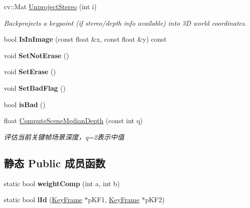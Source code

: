 \begin{DoxyCompactItemize}
\item 
cv\-::\-Mat \hyperlink{classORB__SLAM2_1_1KeyFrame_a0d2dc03ca0d62fc5585773e43d503e79}{Unproject\-Stereo} (int i)
\begin{DoxyCompactList}\small\item\em Backprojects a keypoint (if stereo/depth info available) into 3\-D world coordinates. \end{DoxyCompactList}\item 
\hypertarget{classORB__SLAM2_1_1KeyFrame_a680f4de60b656aabb8e9622a0e7d6d58}{bool {\bfseries Is\-In\-Image} (const float \&x, const float \&y) const }\label{classORB__SLAM2_1_1KeyFrame_a680f4de60b656aabb8e9622a0e7d6d58}

\item 
\hypertarget{classORB__SLAM2_1_1KeyFrame_aa64c7adb5f80f260cb7e997f68881b09}{void {\bfseries Set\-Not\-Erase} ()}\label{classORB__SLAM2_1_1KeyFrame_aa64c7adb5f80f260cb7e997f68881b09}

\item 
\hypertarget{classORB__SLAM2_1_1KeyFrame_a9424cf54c979bc87df12b48e3827e834}{void {\bfseries Set\-Erase} ()}\label{classORB__SLAM2_1_1KeyFrame_a9424cf54c979bc87df12b48e3827e834}

\item 
\hypertarget{classORB__SLAM2_1_1KeyFrame_a365ec4d06acbbcd668aa5a069c69fdaa}{void {\bfseries Set\-Bad\-Flag} ()}\label{classORB__SLAM2_1_1KeyFrame_a365ec4d06acbbcd668aa5a069c69fdaa}

\item 
\hypertarget{classORB__SLAM2_1_1KeyFrame_a95c437e42b4894a4acc9f05af61e9963}{bool {\bfseries is\-Bad} ()}\label{classORB__SLAM2_1_1KeyFrame_a95c437e42b4894a4acc9f05af61e9963}

\item 
float \hyperlink{classORB__SLAM2_1_1KeyFrame_aa4c5f9ea38d377cfa70d441e184803ae}{Compute\-Scene\-Median\-Depth} (const int q)
\begin{DoxyCompactList}\small\item\em 评估当前关键帧场景深度，q=2表示中值 \end{DoxyCompactList}\end{DoxyCompactItemize}
\subsection*{静态 Public 成员函数}
\begin{DoxyCompactItemize}
\item 
\hypertarget{classORB__SLAM2_1_1KeyFrame_ad2d0287d1ca4a91cd9d684754c84a08b}{static bool {\bfseries weight\-Comp} (int a, int b)}\label{classORB__SLAM2_1_1KeyFrame_ad2d0287d1ca4a91cd9d684754c84a08b}

\item 
\hypertarget{classORB__SLAM2_1_1KeyFrame_a921334deb73b3103f5a78322eab9bc99}{static bool {\bfseries l\-Id} (\hyperlink{classORB__SLAM2_1_1KeyFrame}{Key\-Frame} $\ast$p\-K\-F1, \hyperlink{classORB__SLAM2_1_1KeyFrame}{Key\-Frame} $\ast$p\-K\-F2)}\label{classORB__SLAM2_1_1KeyFrame_a921334deb73b3103f5a78322eab9bc99}

\end{DoxyCompactItemize}
